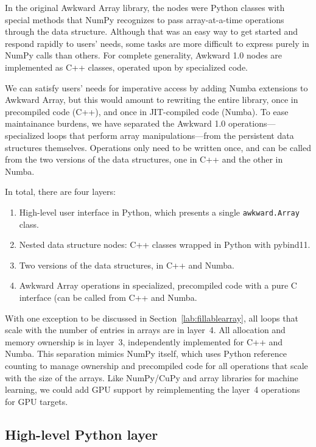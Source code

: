 \documentclass{webofc}
\begin{document}
In the original Awkward Array library, the nodes were Python classes with special methods that NumPy recognizes to pass array-at-a-time operations through the data structure. Although that was an easy way to get started and respond rapidly to users' needs, some tasks are more difficult to express purely in NumPy calls than others. For complete generality, Awkward 1.0 nodes are implemented as C++ classes, operated upon by specialized code.

We can satisfy users' needs for imperative access by adding Numba extensions to Awkward Array, but this would amount to rewriting the entire library, once in precompiled code (C++), and once in JIT-compiled code (Numba). To ease maintainance burdens, we have separated the Awkward 1.0 operations---specialized loops that perform array manipulations---from the persistent data structures themselves. Operations only need to be written once, and can be called from the two versions of the data structures, one in C++ and the other in Numba.

In total, there are four layers:

\begin{enumerate}
\item High-level user interface in Python, which presents a single \texttt{awkward.Array} class.
\item Nested data structure nodes: C++ classes wrapped in Python with pybind11.
\item Two versions of the data structures, in C++ and Numba.
\item Awkward Array operations in specialized, precompiled code with a pure C interface (can be called from C++ and Numba.
\end{enumerate}

\noindent With one exception to be discussed in Section~\ref{lab:fillablearray}, all loops that scale with the number of entries in arrays are in layer~4. All allocation and memory ownership is in layer~3, independently implemented for C++ and Numba. This separation mimics NumPy itself, which uses Python reference counting to manage ownership and precompiled code for all operations that scale with the size of the arrays. Like NumPy/CuPy and array libraries for machine learning, we could add GPU support by reimplementing the layer~4 operations for GPU targets.

\subsection{High-level Python layer}
\end{document}
